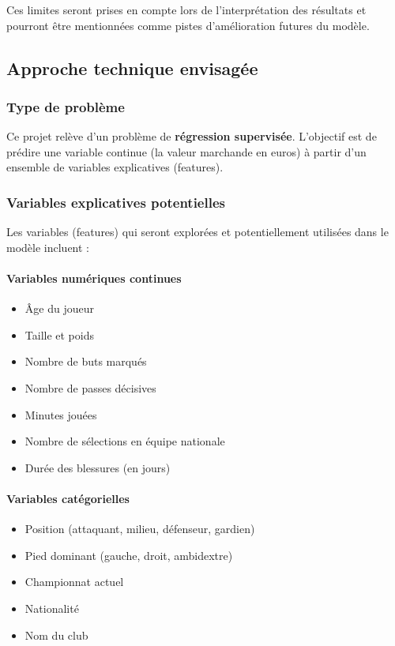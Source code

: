 \documentclass[12pt,a4paper]{article}
\begin{document}
Ces limites seront prises en compte lors de l'interprétation des résultats et pourront être mentionnées comme pistes d'amélioration futures du modèle.

\newpage

\subsection{Approche technique envisagée}

\subsubsection{Type de problème}

Ce projet relève d'un problème de \textbf{régression supervisée}. L'objectif est de prédire une variable continue (la valeur marchande en euros) à partir d'un ensemble de variables explicatives (features).

\subsubsection{Variables explicatives potentielles}

Les variables (features) qui seront explorées et potentiellement utilisées dans le modèle incluent :

\paragraph{Variables numériques continues}

\begin{itemize}[leftmargin=*]
    \item Âge du joueur
    \item Taille et poids
    \item Nombre de buts marqués
    \item Nombre de passes décisives
    \item Minutes jouées
    \item Nombre de sélections en équipe nationale
    \item Durée des blessures (en jours)
\end{itemize}

\paragraph{Variables catégorielles}

\begin{itemize}[leftmargin=*]
    \item Position (attaquant, milieu, défenseur, gardien)
    \item Pied dominant (gauche, droit, ambidextre)
    \item Championnat actuel
    \item Nationalité
    \item Nom du club
\end{itemize}
\end{document}
